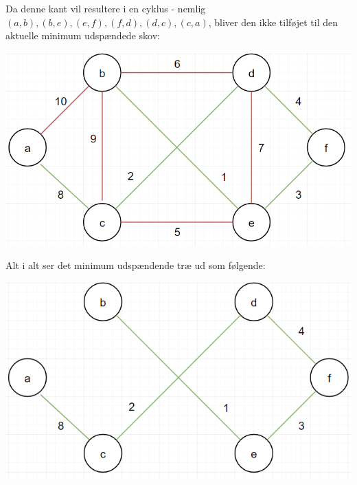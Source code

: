 \documentclass{report}
\begin{document}
Da denne kant vil resultere i en cyklus - nemlig $(a, b), (b, e), (e, f), (f, d), (d, c), (c, a)$, bliver den ikke tilføjet til den aktuelle minimum udspændede skov:
\begin{center}
    \includegraphics[height = 5 cm]{../entities/kruskal11}
\end{center}
Alt i alt ser det minimum udspændende træ ud som følgende:
\begin{center}
    \includegraphics[height = 5 cm]{../entities/kruskal9}
\end{center}

\newpage
\end{document}
